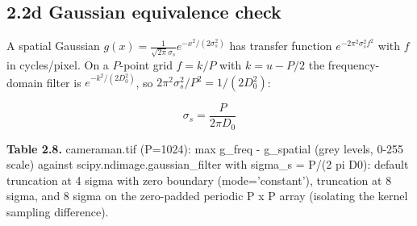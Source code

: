 \documentclass[10pt,a4paper]{article}
\begin{document}
\subsection{2.2d Gaussian equivalence check}
A spatial Gaussian $g(x)=\frac{1}{\sqrt{2\pi}\sigma_s}e^{-x^2/(2\sigma_s^2)}$ has transfer function $e^{-2\pi^2\sigma_s^2 f^2}$ with $f$ in cycles/pixel. On a $P$-point grid $f=k/P$ with $k=u-P/2$ the frequency-domain filter is $e^{-k^2/(2D_0^2)}$, so $2\pi^2\sigma_s^2/P^2=1/(2D_0^2)$:

\begin{equation}\sigma_s=\frac{P}{2\pi D_0}\end{equation}
\begin{table}[H]\centering\footnotesize{\small\textbf{Table 2.8.} cameraman.tif (P=1024): max \textbar{}g\_freq - g\_spatial\textbar{} (grey levels, 0-255 scale) against scipy.ndimage.gaussian\_filter with sigma\_s = P/(2 pi D0): default truncation at 4 sigma with zero boundary (mode='constant'), truncation at 8 sigma, and 8 sigma on the zero-padded periodic P x P array (isolating the kernel sampling difference).\par}\vskip 3pt
\end{table}
\end{document}

